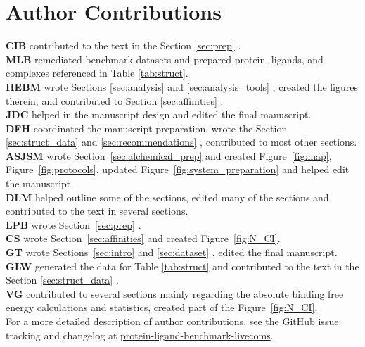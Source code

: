 \documentclass[9pt,bestpractices,pubversion]{livecoms}
\newcommand{\githubrepository}{\href{https://github.com/openforcefield/FE-Benchmarks-Best-Practices}{protein-ligand-benchmark-livecoms}}  %
\begin{document}
\section{Author Contributions}
%
  \textbf{CIB} contributed to the text in the Section \ref{sec:prep} .\\
   \textbf{MLB} remediated benchmark datasets and prepared protein, ligands, and complexes referenced in Table \ref{tab:struct}.\\
  \textbf{HEBM} wrote Sections \ref{sec:analysis}  and \ref{sec:analysis_tools} , created the figures therein, and contributed to Section \ref{sec:affinities} .\\
  \textbf{JDC} helped in the manuscript design and edited the final manuscript.\\
  \textbf{DFH} coordinated the manuscript preparation, wrote the Section \ref{sec:struct_data}   and \ref{sec:recommendations} , contributed to most other sections.\\
  \textbf{ASJSM} wrote Section~\ref{sec:alchemical_prep}  and created Figure~\ref{fig:map}, Figure~\ref{fig:protocols}, updated Figure~\ref{fig:system_preparation} and helped edit the manuscript. \\
  \textbf{DLM} helped outline some of the sections, edited many of the sections and contributed to the text in several sections. \\
  \textbf{LPB} wrote Section~\ref{sec:prep} .\\
  \textbf{CS} wrote Section~\ref{sec:affinities}  and created Figure~\ref{fig:N_CI}.\\
  \textbf{GT} wrote Sections~\ref{sec:intro}  and \ref{sec:dataset} , edited the final manuscript.\\
  \textbf{GLW} generated the data for Table \ref{tab:struct} and contributed to the text in the Section \ref{sec:struct_data}  .\\
  \textbf{VG} contributed to several sections mainly regarding the absolute binding free energy calculations and statistics, created part of the Figure~\ref{fig:N_CI}.\\
For a more detailed description of author contributions,
see the GitHub issue tracking and changelog at \githubrepository.
\end{document}
